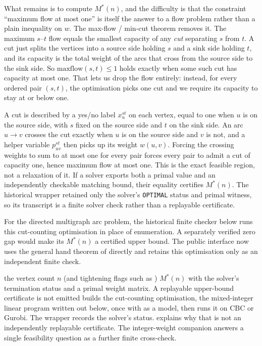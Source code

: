 What remains is to compute $M^{*}(n)$, and the difficulty is that the constraint ``maximum flow at most one'' is itself the answer to a flow problem rather than a plain inequality on $w$. The max-flow / min-cut theorem removes it. The maximum $s$--$t$ flow equals the smallest capacity of any \emph{cut} separating $s$ from $t$. A cut just splits the vertices into a source side holding $s$ and a sink side holding $t$, and its capacity is the total weight of the arcs that cross from the source side to the sink side. So $\mathrm{maxflow}(s, t) \le 1$ holds exactly when some such cut has capacity at most one. That lets us drop the flow entirely: instead, for every ordered pair $(s, t)$, the optimisation picks one cut and we require its capacity to stay at or below one.

A cut is described by a yes/no label $x^{st}_u$ on each vertex, equal to one when $u$ is on the source side, with $s$ fixed on the source side and $t$ on the sink side. An arc $u \to v$ crosses the cut exactly when $u$ is on the source side and $v$ is not, and a helper variable $p^{st}_{uv}$ then picks up its weight $w(u, v)$. Forcing the crossing weights to sum to at most one for every pair forces every pair to admit a cut of capacity one, hence maximum flow at most one. This is the exact feasible region, not a relaxation of it. If a solver exports both a primal value and an independently checkable matching bound, their equality certifies $M^{*}(n)$. The historical wrapper retained only the solver's \texttt{OPTIMAL} status and primal witness, so its transcript is a finite solver check rather than a replayable certificate.

For the directed multigraph arc problem, the historical finite checker below runs this cut-counting optimisation in place of enumeration. A separately verified zero gap would make its $M^{*}(n)$ a certified upper bound. The public  interface now uses the general hand theorem of  directly and retains this optimisation only as an independent finite check.

{the vertex count $n$ (and tightening flags such as )}
{$M^{*}(n)$ with the solver's termination status and a primal weight matrix. A replayable upper-bound certificate is not emitted}
{builds the cut-counting optimisation, the mixed-integer linear program written out below, once with  as a  model, then  runs it on CBC or Gurobi. The wrapper records the solver's status.  explains why that is not an independently replayable certificate. The integer-weight companion  answers a single feasibility question as a further finite cross-check.}

